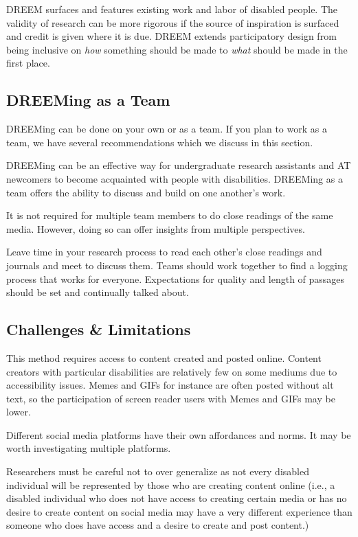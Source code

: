 DREEM surfaces and features existing work and labor of disabled people. The validity of research can be more rigorous if the source of inspiration is surfaced and credit is given where it is due. DREEM extends participatory design from being inclusive on \textit{how} something should be made to \textit{what} should be made in the first place.

\subsection{DREEMing as a Team}
DREEMing can be done on your own or as a team. If you plan to work as a team, we have several recommendations which we discuss in this section.

DREEMing can be an effective way for undergraduate research assistants and AT newcomers to become acquainted with people with disabilities. DREEMing as a team offers the ability to discuss and build on one another's work. 

It is not required for multiple team members to do close readings of the same media. However, doing so can offer insights from multiple perspectives. 

Leave time in your research process to read each other's close readings and journals and meet to discuss them. Teams should work together to find a logging process that works for everyone. Expectations for quality and length of passages should be set and continually talked about. 


\subsection{Challenges \& Limitations}

This method requires access to content created and posted online.
Content creators with particular disabilities are relatively few on some mediums due to accessibility issues. Memes and GIFs for instance are often posted without alt text,\cite{gleasonMakingGIFsAccessible2020} so the participation of screen reader users with Memes and GIFs may be lower. 

Different social media platforms have their own affordances and norms. It may be worth investigating multiple platforms. 

Researchers must be careful not to over generalize as not every disabled individual will be represented by those who are creating content online (i.e., a disabled individual who does not have access to creating certain media or has no desire to create content on social media may have a very different experience than someone who does have access and a desire to create and post content.) %



